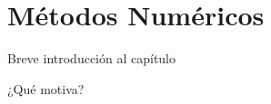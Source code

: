 \chapter{Métodos Numéricos}\label{cap:numericos}

Breve introducción al capítulo

¿Qué motiva?

\section{}

